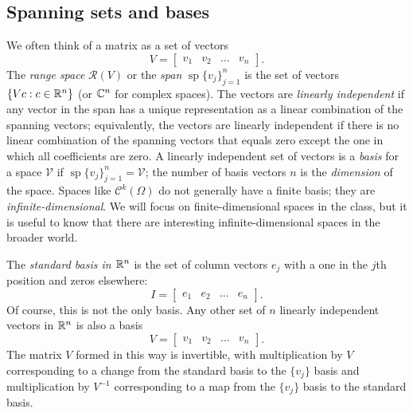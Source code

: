 \documentclass[12pt, leqno]{article}
\begin{document}
\subsection{Spanning sets and bases}

We often think of a matrix as a set of vectors
\[
  V = \begin{bmatrix} v_1 & v_2 & \ldots & v_n \end{bmatrix}.
\]
The {\em range space} $\mathcal{R}(V)$ or the {\em span}
$\operatorname{sp}\{ v_j \}_{j=1}^n$ is the set of vectors
$\{ V c : c \in \mathbb{R}^n \}$ (or $\mathbb{C}^n$
for complex spaces).  The vectors are {\em linearly independent}
if any vector in the span has a unique representation as a linear
combination of the spanning vectors; equivalently, the vectors are
linearly independent if there is no linear combination of the
spanning vectors that equals zero except the one in which all
coefficients are zero.  A linearly independent set of vectors is
a {\em basis} for a space $\mathcal{V}$ if
$\operatorname{sp}\{v_j\}_{j=1}^n = \mathcal{V}$; the number of
basis vectors $n$ is the {\em dimension} of the space.  Spaces
like $\mathcal{C}^k(\Omega)$ do not generally have a finite basis;
they are {\em infinite-dimensional}.  We will focus on
finite-dimensional spaces in the class, but it is useful to know
that there are interesting infinite-dimensional spaces in the
broader world.

The {\em standard basis in $\mathbb{R}^n$} is the set of column vectors
$e_j$ with a one in the $j$th position and zeros elsewhere:
\[
  I = \begin{bmatrix} e_1 & e_2 & \ldots & e_n \end{bmatrix}.
\]
Of course, this is not the only basis.  Any other set of $n$ linearly
independent vectors in $\mathbb{R}^n$ is also a basis
\[
  V = \begin{bmatrix} v_1 & v_2 & \ldots & v_n \end{bmatrix}.
\]
The matrix $V$ formed in this way is invertible, with multiplication
by $V$ corresponding to a change from the standard basis to the
$\{v_j\}$ basis and multiplication by $V^{-1}$ corresponding to a map
from the $\{v_j\}$ basis to the standard basis.
\end{document}

